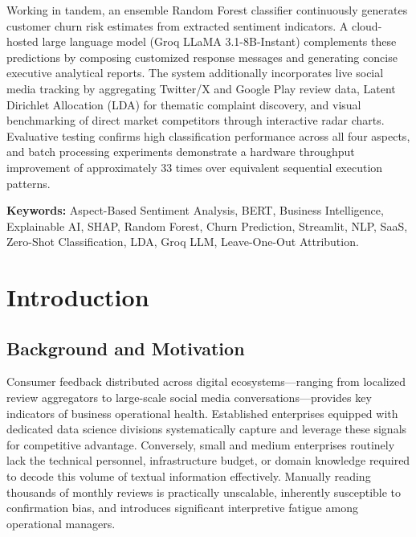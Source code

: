 \documentclass[12pt,a4paper]{report}
\begin{document}
Working in tandem, an ensemble Random Forest classifier continuously generates customer churn risk estimates from extracted sentiment indicators. A cloud-hosted large language model (Groq LLaMA 3.1-8B-Instant) complements these predictions by composing customized response messages and generating concise executive analytical reports. The system additionally incorporates live social media tracking by aggregating Twitter/X and Google Play review data, Latent Dirichlet Allocation (LDA) for thematic complaint discovery, and visual benchmarking of direct market competitors through interactive radar charts. Evaluative testing confirms high classification performance across all four aspects, and batch processing experiments demonstrate a hardware throughput improvement of approximately 33 times over equivalent sequential execution patterns.

\vspace{0.5cm}
\noindent\textbf{Keywords:} Aspect-Based Sentiment Analysis, BERT, Business Intelligence, Explainable AI, SHAP, Random Forest, Churn Prediction, Streamlit, NLP, SaaS, Zero-Shot Classification, LDA, Groq LLM, Leave-One-Out Attribution.

\newpage
\tableofcontents

\newpage
\listoffigures
\listoftables

\chapter{Introduction}
\thispagestyle{fancy}

\section{Background and Motivation}
Consumer feedback distributed across digital ecosystems—ranging from localized review aggregators to large-scale social media conversations—provides key indicators of business operational health. Established enterprises equipped with dedicated data science divisions systematically capture and leverage these signals for competitive advantage. Conversely, small and medium enterprises routinely lack the technical personnel, infrastructure budget, or domain knowledge required to decode this volume of textual information effectively. Manually reading thousands of monthly reviews is practically unscalable, inherently susceptible to confirmation bias, and introduces significant interpretive fatigue among operational managers.
\end{document}
